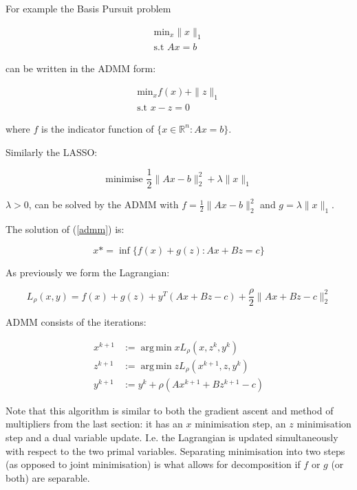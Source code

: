 \documentclass{article}
\DeclareMathOperator*{\argmin}{arg\,min}
\newcommand{\re}{{\mathbb{R}}}
\begin{document}
For example the Basis Pursuit problem

\begin{align}
\text{min}_{x} \|x\|_1
\\
\text{s.t } Ax = b
\label{bp}
\end{align}

can be written in the ADMM form:

\begin{align}
\text{min}_{x} f\left( x \right) + \|z\|_1
\\
\text{s.t } x - z = 0
\label{orig_problem}
\end{align}

where \(f\) is the indicator function of \(\{x\in \re^n : Ax = b\}\). 

Similarly the LASSO:

\begin{equation}
\text{minimise } \frac{1}{2}\|Ax-b\|_2^2 + \lambda\|x\|_1
\end{equation}

\(\lambda > 0\), can be solved by the ADMM with \(f = \frac{1}{2}\|Ax-b\|_2^2\) and \(g = \lambda\|x\|_1\).

The solution of (\ref{admm}) is:

\begin{equation}
x* = \inf\{f\left( x \right) + g\left(z\right) : Ax +Bz = c\}
\end{equation}

As previously we form the Lagrangian:

\begin{equation}
L_\rho\left(x,y\right) = f\left( x \right) + g\left(z\right) + y^T\left(Ax+Bz-c\right) + \frac{\rho}{2}\|Ax+Bz-c\|_2^2
\end{equation}

ADMM consists of the iterations:

\begin{align}
x^{k+1} &:= \argmin{x} L_\rho\left(x,z^k,y^k\right)\\
z^{k+1} &:= \argmin{z} L_\rho\left(x^{k+1},z,y^k\right)\\
y^{k+1} &:= y^{k} + \rho \left(Ax^{k+1} + Bz^{k+1} - c\right)
\label{admm_algo}
\end{align}

Note that this algorithm is similar to both the gradient ascent and method of multipliers from the last section: it has an \(x\) minimisation step, an \(z\) minimisation step and a dual variable update. I.e. the Lagrangian is updated simultaneously with respect to the two primal variables. Separating minimisation into two steps (as opposed to joint minimisation) is what allows for decomposition if \(f\) or \(g\) (or both) are separable. 
\end{document}
